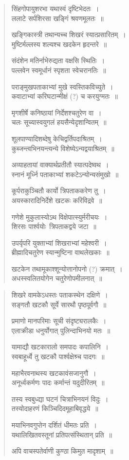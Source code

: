 \documentclass[11pt, openany]{book}
\begin{document}
\begin{quote}
{\qt सिंहगोपायुशरभा यथास्वं दृष्टिभेदतः~।\\
ललाटे सर्पशिरसा खङ्गिं श्रवणमूलतः~॥

खङ्गिकास्त्री तथान्यच्च शिखरं स्यात्प्रसारितम्~।\\
मुष्टिर्मल्लस्य शल्यश्च खदकेन हृदन्तरे~॥

संदंशेन मतिर्नाभेरुद्यता वक्षसि स्थितिः~।\\
पल्लवेन स्वमूर्धानं स्पृशता स्वेचरानतिः~॥

पराङ्मुखपताकाभ्यां मुखे स्वस्तिकविच्युते~।\\
कवाटाभ्यां करिघटान्मीक्षं (?) च करयुग्मतः~॥

मृगशीर्षे कनिष्ठायां निर्देशश्चतुरेण वा~।\\
चलः सूच्यास्वयुगलं हयसैन्येदृशान्वितम्~॥

शूलपाण्यादिशब्देषु केचिद्वर्तिपदाश्रितम्~।\\
कुब्जन्त्वभिनयन्त्यन्ये विशेष्येऽन्यद्वयाश्रितम्~॥

अव्याहतायां वाक्यार्थप्रतीतौ स्यात्पदेष्वथ~।\\
स्नानं मूर्ध्नि पताकाभ्यां शकटेऽन्योन्यसंमुखो~॥

कूर्पराकुञ्चितौ कार्यो त्रिपताककरेण तु~।\\
अयस्कारादिनिर्देशे खटकः करिविद्रवे~॥

गणेशे मुकुलास्योऽथ विक्षेपात्स्युर्मरीचयः~।\\
शिरसः पार्श्वयोः\textendash\ त्रिपताकद्वये जटा~॥

उपर्यृपरि युक्ताभ्यां शिखराभ्यां महेश्वरी~।\\
ब्रीह्मादिचतुरेण स्यान्मुष्टिना वाथलेखकाः~॥

खटकेन तथामूकाश्शून्योत्तानोपनो (?) क्रमात्~।\\
अधस्स्वलितयोगेन चतुरेणोपमीलनात्~॥}
\end{quote}

\newpage

\begin{quote}
{\qt शिखरे वामकेऽधस्तः पताकस्थेन दक्षिणे~।\\
सङ्गतौ खटकौ सूर्ये सारथौ पृष्ठपूर्वगौ~॥

प्रमाणो मानपरिमाः सूची संदृष्ट्यरालकैः~।\\
एलाक्रीडा धनुर्योगात् पुलिन्दाभिनयो मतः~॥

यामाद्यौ खटकारालो समपादः कपालिनि~।\\
स्वबाहूर्ध्वे तु खटकौ पार्श्वक्षेश्र्च पादगः~॥

महाभैरवनाथस्य खटकावंसजानुगौ~।\\
अनूर्ध्वकर्मणः पादः कर्मान्तं यदुदीरितम्~॥

तस्य स्वबुध्द्या घटनं चित्राभिनयनं विदुः~।\\
तस्योदाहरणं किञ्चिदिदमूहाबिवृद्धये~॥

मयाभिनवगुप्तेन दर्शितं धीमतः प्रति~।\\
यथालिखितवस्तूनां प्रतिपत्संस्थितान् प्रति~॥

अपि वाचस्पतेर्वाणी कुण्ठा किमुत मादृशाम्~॥}
\end{quote}
\end{document}
